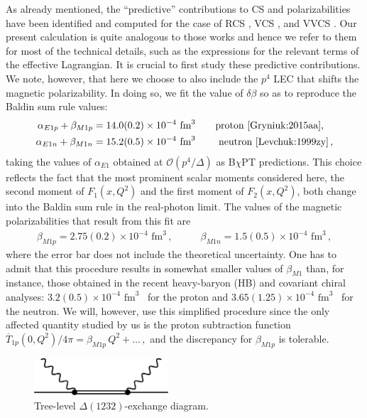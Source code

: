 \documentclass[12pt,preprint,tightenlines,
showpacs,preprintnumbers,amsmath,amssymb,
a4paper,nofootinbib]{revtex4-2}
\def\eqlab#1{\label{eq:#1}}
\def\ol#1{\overline{#1}}
\begin{document}
As already mentioned, the ``predictive'' contributions to CS and polarizabilities have been identified  and computed  for the case
of RCS \cite{Lensky:2009uv}, 
VCS \cite{Lensky:2016nui}, and  VVCS \cite{Lensky:2014dda}.
Our present calculation is quite analogous to those works and hence 
we refer to them for most of the technical details, such as the expressions for the
relevant terms of the effective Lagrangian. It is crucial to first study these predictive contributions. We note, however,
that here we choose to also include the $p^4$ LEC that shifts the magnetic polarizability. In doing so,
we fit the value of $\delta\beta$ so as to reproduce the Baldin sum rule values:
\begin{subequations}
\eqlab{fittedBaldin}
\begin{align}
\alpha_{E1p}+\beta_{M1p} & = 14.0(0.2)\times 10^{-4} \text{ fm}^3 \text{\qquad proton~\cite{Gryniuk:2015aa},}\\
\alpha_{E1n}+\beta_{M1n} & = 15.2(0.5)\times 10^{-4} \text{ fm}^3 \text{ \qquad neutron~\cite{Levchuk:1999zy}}\,,
\end{align}
\end{subequations}
taking the values of $\alpha_{E1}$ obtained at $\mathcal{O}(p^4/\varDelta)$ as B$\chi$PT predictions.
This choice reflects the fact that the most prominent scalar moments considered here, the second moment
of $F_1(x,Q^2)$ and the first moment of $F_2(x,Q^2)$, both change into the Baldin sum rule in the real-photon limit. The values of the magnetic polarizabilities that result from this fit are
\begin{align}\eqlab{newBeta}
    \beta_{M1p} = 2.75(0.2)\times10^{-4}\text{ fm}^3\,, &\qquad \beta_{M1n} = 1.5(0.5)\times10^{-4}\text{ fm}^3\,,
\end{align}
where the error bar does not include the theoretical uncertainty. One has to admit that this procedure results in somewhat smaller values of $\beta_{M1}$ than, for instance, those obtained in the recent heavy-baryon (HB) and covariant chiral analyses: $3.2(0.5)\times10^{-4}\text{ fm}^3$~\cite{Lensky:2014efa,Griesshammer:2012we} for the proton and $3.65(1.25)\times10^{-4}\text{ fm}^3$~\cite{Myers14} for the neutron.
 We will, however, use this simplified procedure since the only affected quantity studied by us
is the proton subtraction function $\ol{T}_{1p}(0,Q^2)/4\pi=\beta_{M1p}\,Q^2+\dots\,,$ and the
discrepancy for $\beta_{M1p}$ is tolerable.

\begin{figure}[tbh]
\centering
 \includegraphics[width=5cm]{DeltaExchange.pdf}
 \caption{\small{Tree-level $\Delta(1232)$-exchange diagram. \label{DeltaExchange}}}
\end{figure}
\end{document}

